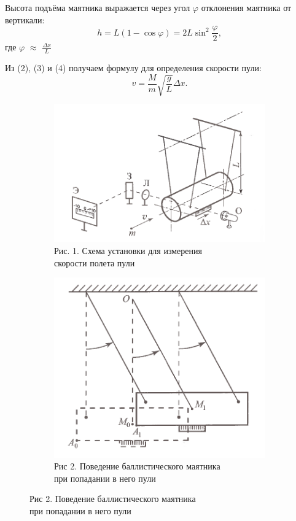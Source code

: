 \documentclass[
	a4paper, %
	12pt, %
]{article}
\renewcommand {\phi}{\varphi}
\begin{document}
	Высота подъёма маятника выражается через угол $\phi$ отклонения маятника от вертикали:
	\begin{equation}
		h = L(1 - \cos{\phi}) = 2L\sin^2{\frac{\phi}{2}},
	\end{equation}
	где $\phi$ $\approx$ $\frac{\Delta x}{L}$
	
	Из (2), (3) и (4) получаем формулу для определения скорости пули:
	\begin{equation}
		v = \frac{M}{m}\sqrt{\frac{g}{L}}\Delta x.
	\end{equation}
	
	
	\begin{figure}[h]
		
		\begin{subfigure}{0.5\textwidth}
			\includegraphics[width=0.9\linewidth]{1.png} 
			\caption{Рис. 1. Схема установки для измерения\\ скорости полета пули}
			\label{fig:subim1}
		\end{subfigure}
		\begin{subfigure}{0.5\textwidth}
			\includegraphics[width=0.9\linewidth]{2.png}
			\caption{Рис 2. Поведение баллистического маятника\\ при попадании в него пули}
			\label{fig:subim2}
		\end{subfigure}
		
	\end{figure}
	
\end{document}
